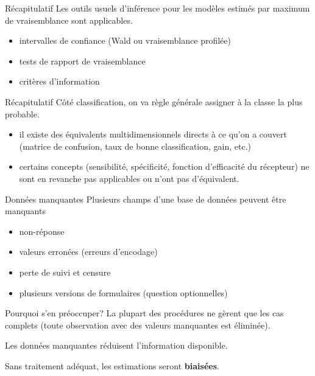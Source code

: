 \documentclass[
  ignorenonframetext,
]{beamer}
\providecommand{\tightlist}{%
  \setlength{\itemsep}{0pt}\setlength{\parskip}{0pt}}\usepackage{longtable,booktabs,array}
\begin{document}
\begin{frame}{Récapitulatif}
\label{ruxe9capitulatif-2}
Les outils usuels d'inférence pour les modèles estimés par maximum de
vraisemblance sont applicables.

\begin{itemize}
\tightlist
\item
  intervalles de confiance (Wald ou vraisemblance profilée)
\item
  tests de rapport de vraisemblance
\item
  critères d'information
\end{itemize}
\end{frame}

\begin{frame}{Récapitulatif}
\label{ruxe9capitulatif-3}
Côté classification, on va règle générale assigner à la classe la plus
probable.

\begin{itemize}
\tightlist
\item
  il existe des équivalents multidimensionnels directs à ce qu'on a
  couvert (matrice de confusion, taux de bonne classification, gain,
  etc.)
\item
  certains concepts (sensibilité, spécificité, fonction d'efficacité du
  récepteur) ne sont en revanche pas applicables ou n'ont pas
  d'équivalent.
\end{itemize}
\end{frame}

\begin{frame}{Données manquantes}
\label{donnuxe9es-manquantes}
Plusieurs champs d'une base de données peuvent être manquants

\begin{itemize}
\tightlist
\item
  non-réponse
\item
  valeurs erronées (erreurs d'encodage)
\item
  perte de suivi et censure
\item
  plusieurs versions de formulaires (question optionnelles)
\end{itemize}
\end{frame}

\begin{frame}{Pourquoi s'en préoccuper?}
\label{pourquoi-sen-pruxe9occuper}
La plupart des procédures ne gèrent que les cas complets (toute
observation avec des valeurs manquantes est éliminée).

Les données manquantes réduisent l'information disponible.

Sans traitement adéquat, les estimations seront \textbf{biaisées}.
\end{frame}
\end{document}
